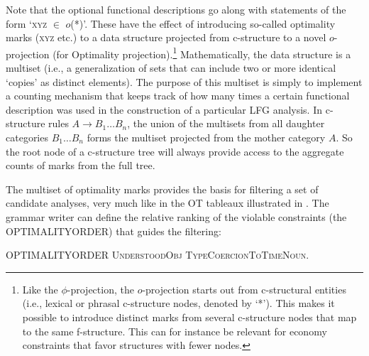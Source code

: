 \documentclass[output=paper,hidelinks]{langscibook}
\begin{document}
\ea\label{ex:OT-templ}
\ea
{}
\ex
{}
\z
\z

\noindent
Note that the optional functional descriptions go along with statements of the form `\textsc{xyz} $\in$ $o$(*)'. These have the effect of introducing so-called optimality marks (\textsc{xyz} etc.) to a data structure projected from c-structure to a novel $o$-projection (for Optimality projection).\footnote{Like the $\phi$-projection, the $o$-projection starts out from c-structural entities (i.e., lexical or phrasal c-structure nodes, denoted by `*'). This makes it possible to introduce distinct marks from several c-structure nodes that map to the same f-structure. This can for instance be relevant for economy constraints that favor structures with fewer nodes.}  Mathematically, the data structure is a multiset (i.e., a generalization of sets that can include two or more identical `copies' as distinct elements). The purpose of this multiset is simply to implement a counting mechanism that keeps track of how many times a certain functional description was used in the construction of a particular LFG analysis. In c-structure rules $A \rightarrow B_1 \dots B_n$, the union of the multisets from all daughter categories $B_1 \dots B_n$ forms  the multiset projected from the mother category $A$. So the root node of a c-structure tree will always provide access to the aggregate counts of marks from the full tree.

The multiset of optimality marks provides the basis for filtering a set of candidate analyses, very much like in the OT tableaux illustrated in .  The grammar writer can define the relative ranking of the violable constraints (the OPTIMALITYORDER) that guides the filtering:

\ea\label{ex:optimality-order}
OPTIMALITYORDER \textsc{UnderstoodObj} \textsc{TypeCoercionToTimeNoun}.
\z
\end{document}
